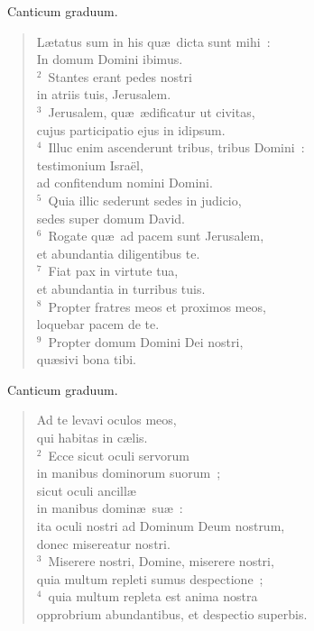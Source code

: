 ~\lettrine[lines=10,image=true,loversize=0.05,lraise=-0.03]{C}{}anticum graduum. \begin{flushleft}\begin{verse}\vspace{6pt}L\ae tatus sum in his qu\ae\ dicta sunt mihi~:\\ In domum Domini ibimus.\\
${}^{2}$~Stantes erant pedes nostri\\ in atriis tuis, Jerusalem.\\
${}^{3}$~Jerusalem, qu\ae\ \ae dificatur ut civitas,\\ cujus participatio ejus in idipsum.\\
${}^{4}$~Illuc enim ascenderunt tribus, tribus Domini~:\\ testimonium Isra\"el,\\ ad confitendum nomini Domini.\\
${}^{5}$~Quia illic sederunt sedes in judicio,\\ sedes super domum David.\\
${}^{6}$~Rogate qu\ae\ ad pacem sunt Jerusalem,\\ et abundantia diligentibus te.\\
${}^{7}$~Fiat pax in virtute tua,\\ et abundantia in turribus tuis.\\
${}^{8}$~Propter fratres meos et proximos meos,\\ loquebar pacem de te.\\
${}^{9}$~Propter domum Domini Dei nostri,\\ qu\ae sivi bona tibi.\end{verse}\end{flushleft}


~\lettrine[lines=10,image=true,loversize=0.05,lraise=-0.03]{C}{}anticum graduum. \begin{flushleft}\begin{verse}\vspace{6pt}Ad te levavi oculos meos,\\ qui habitas in c\ae lis.\\
${}^{2}$~Ecce sicut oculi servorum\\ in manibus dominorum suorum~;\\ sicut oculi ancill\ae \\ in manibus domin\ae\ su\ae~:\\ ita oculi nostri ad Dominum Deum nostrum,\\ donec misereatur nostri.\\
${}^{3}$~Miserere nostri, Domine, miserere nostri,\\ quia multum repleti sumus despectione~;\\
${}^{4}$~quia multum repleta est anima nostra\\ opprobrium abundantibus, et despectio superbis.\end{verse}\end{flushleft}


